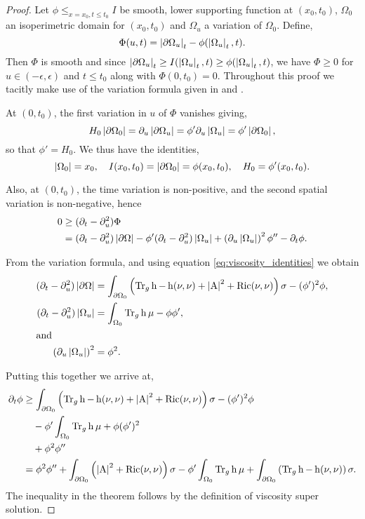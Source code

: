 \documentclass{amsart}
\begin{document}
\begin{proof}
Let \(\phi \leq_{x=x_0, t\leq t_0} I\) be smooth, lower supporting function at \((x_0, t_0)\), \(\Omega_0\) an isoperimetric domain for \((x_0, t_0)\) and \(\Omega_u\) a variation of \(\Omega_0\). Define,
\[
\Phi(u, t) = \left|{\partial {\Omega_u}}\right|_t - \phi(\left|{\Omega_u}\right|_t, t).
\]
Then \(\Phi\) is smooth and since \(\left|{\partial {\Omega_u}}\right|_t \geq I(\left|{\Omega_u}\right|_t, t) \geq \phi(\left|{\Omega_u}\right|_t, t)\), we have \(\Phi \geq 0\) for \(u \in (-\epsilon, \epsilon)\) and \(t \leq t_0\) along with \(\Phi(0, t_0) = 0\). Throughout this proof we tacitly make use of the variation formula given in  and .

At \((0, t_0)\), the first variation in \(u\) of \(\Phi\) vanishes giving,
\[
H_0 \left|{\partial {\Omega_0}}\right| = \partial_u \left|{\partial {\Omega_u}}\right| = \phi' \partial_u \left|{\Omega_u}\right| = \phi' \left|{\partial {\Omega_0}}\right|,
\]
so that \(\phi' = H_0\). We thus have the identities,
\begin{equation}
\label{eq:viscosity_identities}
\left|{\Omega_0}\right| = x_0, \quad I(x_0, t_0) = \left|{\partial {\Omega_0}}\right| = \phi(x_0, t_0), \quad H_0 = \phi'(x_0, t_0).
\end{equation}

Also, at \((0, t_0)\), the time variation is non-positive, and the second spatial variation is non-negative, hence
\[
\begin{split}
0 &\geq (\partial_t - \partial_u^2) \Phi \\
&= (\partial_t - \partial_u^2) \left|{\partial {\Omega}}\right| - \phi'(\partial_t - \partial_u^2) \left|{\Omega_u}\right| + \left(\partial_u \left|{\Omega_u}\right|\right)^2 \phi'' - \partial_t \phi.
\end{split}
\]

From the variation formula, and using equation \eqref{eq:viscosity_identities} we obtain
\begin{align*}
(\partial_t - \partial_u^2) \left|{\partial {\Omega}}\right| &= \int_{\partial {\Omega_0}} \left(\operatorname{Tr}_g \operatorname{h} - \operatorname{h}(\nu, \nu) + \left|{\operatorname{A}}\right|^2 + \operatorname{Ric}(\nu, \nu)\right) \sigma - (\phi')^2 \phi, \\
(\partial_t - \partial_u^2) \left|{\Omega_u}\right| &= \int_{\Omega_0} \operatorname{Tr}_g \operatorname{h} \mu - \phi \phi', \\
\intertext{and}
\left(\partial_u \left|{\Omega_u}\right|\right)^2 &= \phi^2.
\end{align*}

Putting this together we arrive at,
\[
\begin{split}
\partial_t \phi &\geq \int_{\partial {\Omega_0}} \left(\operatorname{Tr}_g \operatorname{h} - \operatorname{h}(\nu, \nu) + \left|{\operatorname{A}}\right|^2 + \operatorname{Ric}(\nu, \nu) \right)\sigma - (\phi')^2 \phi \\
&\quad - \phi'\int_{\Omega_0} \operatorname{Tr}_g \operatorname{h} \mu + \phi (\phi')^2 \\
&\quad + \phi^2 \phi'' \\
&= \phi^2 \phi'' + \int_{\partial {\Omega_0}} \left(\left|{\operatorname{A}}\right|^2 + \operatorname{Ric}(\nu, \nu)\right) \sigma - \phi'\int_{\Omega_0} \operatorname{Tr}_g \operatorname{h} \mu + \int_{\partial {\Omega_0}} \left(\operatorname{Tr}_g \operatorname{h} - \operatorname{h}(\nu, \nu)\right) \sigma.
\end{split}
\]
The inequality in the theorem follows by the definition of viscosity super solution.


\end{proof}
\end{document}
